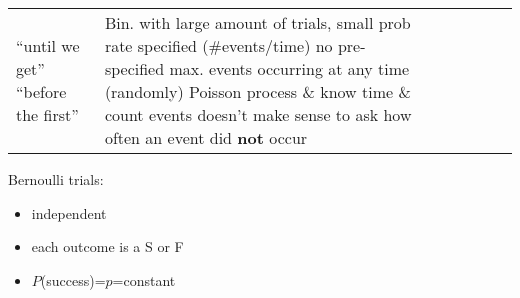 \begin{center}
{\begin{tabular}{ L{2.5cm} | L{3cm} | L{3cm} | L{3cm} | L{3.5cm} | L{3cm} | L{3cm} }
            ``until we get''
            \newline ``before the first''
         &
        
        Bin. with large amount of trials, small prob
            \newline rate specified (\#events/time)
            \newline no pre-specified max.
            \newline events occurring at any time (randomly)
            \newline Poisson process \& know time \& count events
            \newline doesn't make sense to ask how often
            an event did \textbf{not} occur
        
    \end{tabular}}
\end{center}

Bernoulli trials: 
\begin{itemize}
    \item independent
    \item each outcome is a S or F
    \item $P$(success)=$p$=constant
\end{itemize}